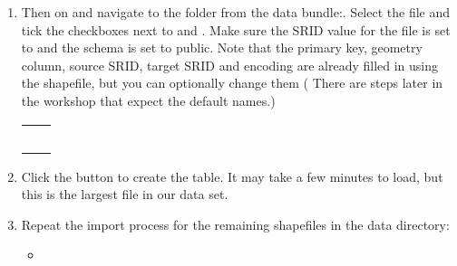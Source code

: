 \documentclass[a4paper,11pt,english]{sphinxmanual}
\begin{document}
\begin{enumerate}
\noindent{}

\item {} 
Then  on  and navigate to the folder from the data bundle:. Select the  file and tick the checkboxes next to  and . Make sure the SRID value for the file is set to  and the schema is set to public. Note that the primary key, geometry column, source SRID, target SRID and encoding are already filled in using the shapefile, but you can optionally change them ( There are steps later in the workshop that expect the default names.)


\begin{savenotes}\sphinxattablestart
\centering
\begin{tabulary}{\linewidth}[t]{|T|T|}
\hline

&
\\
\hline
{}
&
\\
\hline
{}
&
\\
\hline
{}
&
\\
\hline
{}
&
\\
\hline
{}
&
\\
\hline
\end{tabulary}
\par
\sphinxattableend\end{savenotes}

\noindent{}

\item {} 
Click the  button to create the table. It may take a few minutes to load, but this is the largest file in our data set.

\item {} 
Repeat the import process for the remaining shapefiles in the data directory:
\begin{itemize}
\item {} 


\end{itemize}
\end{enumerate}
\end{document}
